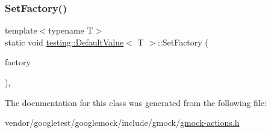 \mbox{\label{classtesting_1_1_default_value_af012445ff5b194940c1427529707cb91}} 
\subsubsection{\texorpdfstring{Set\+Factory()}{SetFactory()}}
{\footnotesize\ttfamily template$<$typename T$>$ \\
static void \hyperlink{classtesting_1_1_default_value}{testing\+::\+Default\+Value}$<$ T $>$\+::Set\+Factory (\begin{DoxyParamCaption}\item[{\hyperlink{classtesting_1_1_default_value_a5763a68d75e0a4c97fcaff708e2df803}{Factory\+Function}}]{factory }\end{DoxyParamCaption})\hspace{0.3cm}{\ttfamily [inline]}, {\ttfamily [static]}}



The documentation for this class was generated from the following file\+:\begin{DoxyCompactItemize}
\item 
vendor/googletest/googlemock/include/gmock/\hyperlink{gmock-actions_8h}{gmock-\/actions.\+h}\end{DoxyCompactItemize}
